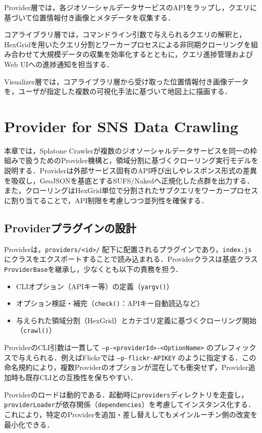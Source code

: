 \documentclass[11pt,a4paper]{jlreq}
\begin{document}
Provider層では，各ジオソーシャルデータサービスのAPIをラップし，クエリに基づいて位置情報付き画像とメタデータを収集する．

コアライブラリ層では，コマンドライン引数で与えられるクエリの解釈と，HexGridを用いたクエリ分割とワーカープロセスによる非同期クローリングを組み合わせて大規模データの収集を効率化するとともに，クエリ進捗管理およびWeb UIへの進捗通知を担当する．

Visualizer層では，コアライブラリ層から受け取った位置情報付き画像データを，ユーザが指定した複数の可視化手法に基づいて地図上に描画する．

\section{Provider for SNS Data Crawling}
\label{sec:provider}

本章では，Splatone Crawlerが複数のジオソーシャルデータサービスを同一の枠組みで扱うためのProvider機構と，領域分割に基づくクローリング実行モデルを説明する．Providerは外部サービス固有のAPI呼び出しやレスポンス形式の差異を吸収し，GeoJSONを基底とするSUFS/Nakedへ正規化した点群を出力する．また，クローリングはHexGrid単位で分割されたサブクエリをワーカープロセスに割り当てることで，API制限を考慮しつつ並列性を確保する．

\subsection{Providerプラグインの設計}
Providerは，\texttt{providers/<id>/} 配下に配置されるプラグインであり，\texttt{index.js} にクラスをエクスポートすることで読み込まれる．Providerクラスは基底クラス\texttt{ProviderBase}を継承し，少なくとも以下の責務を担う．
\begin{itemize}
  \item CLIオプション（APIキー等）の定義（\texttt{yargv()}）
  \item オプション検証・補完（\texttt{check()}：APIキー自動読込など）
  \item 与えられた領域分割（HexGrid）とカテゴリ定義に基づくクローリング開始（\texttt{crawl()}）
\end{itemize}

ProviderのCLI引数は一貫して \texttt{--p-<providerId>-<OptionName>} のプレフィックスで与えられる．例えばFlickrでは \texttt{--p-flickr-APIKEY} のように指定する．この命名規約により，複数Providerのオプションが混在しても衝突せず，Provider追加時も既存CLIとの互換性を保ちやすい．

Providerのロードは動的である．起動時に\texttt{providers}ディレクトリを走査し，\texttt{providerLoader}が依存関係（\texttt{dependencies}）を考慮してインスタンス化する．これにより，特定のProviderを追加・差し替えしてもメインルーチン側の改変を最小化できる．
\end{document}
